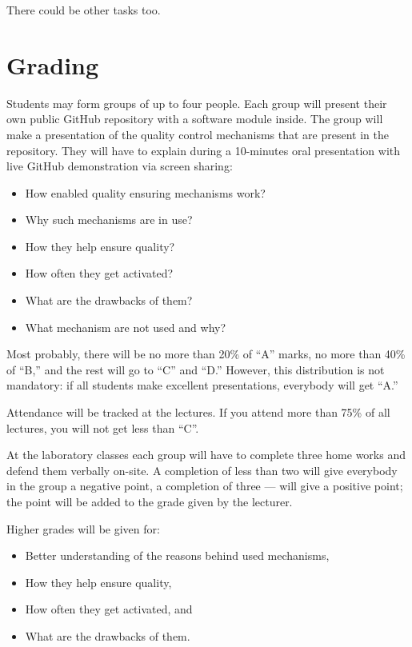 \documentclass[nobrand,anonymous,nodate,nosecurity]{huawei}
\begin{document}
{There could be other tasks too.

\newpage
\section*{Grading}

Students may form groups of up to four people. Each group will present
their own public GitHub repository with a software module inside. The group
will make a presentation of the quality control mechanisms that are
present in the repository. They will have to explain during a 10-minutes
oral presentation with live GitHub demonstration via screen sharing:

\begin{itemize}
	\item How enabled quality ensuring mechanisms work?
	\item Why such mechanisms are in use?
	\item How they help ensure quality?
	\item How often they get activated?
	\item What are the drawbacks of them?
	\item What mechanism are not used and why?
\end{itemize}

Most probably, there will
be no more than 20\% of ``A'' marks, no more than 40\% of ``B,''
and the rest will go to ``C'' and ``D.'' However, this distribution is
not mandatory: if all students make excellent presentations, everybody
will get ``A.''

Attendance will be tracked at the lectures. If you attend more than 75\%
of all lectures, you will not get less than ``C''.

At the laboratory classes each group will have to complete three
home works and defend them verbally on-site.
A completion of less than two will give everybody in the group a negative point,
a completion of three --- will give a positive point; the point will be added
to the grade given by the lecturer.

Higher grades will be given for:

\begin{itemize}
	\item Better understanding of the reasons behind used mechanisms,
	\item How they help ensure quality,
	\item How often they get activated,
	and
	\item What are the drawbacks of them.
\end{itemize}

}
\end{document}
